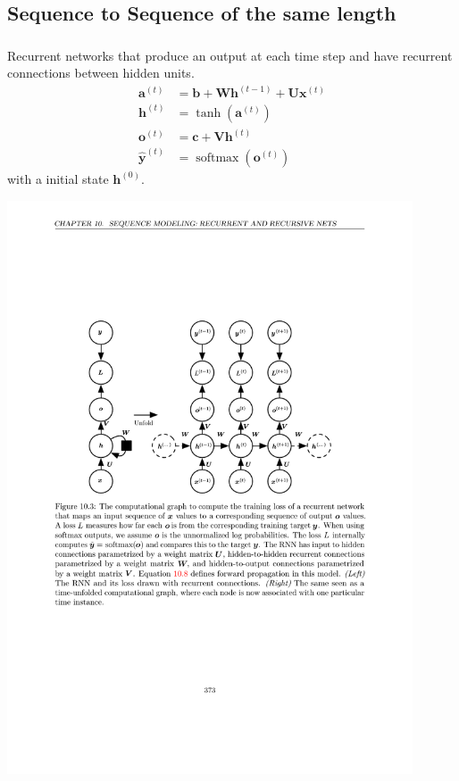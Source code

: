 \documentclass[12pt, a4paper]{article}
\def\vb{\boldsymbol{b}}
\def\vc{\boldsymbol{c}}
\def\vU{\boldsymbol{U}}
\def\vV{\boldsymbol{V}}
\def\vW{\boldsymbol{W}}
\DeclareMathOperator*{\softmax}{softmax}
\newcommand{\egva}[1]{\boldsymbol{a}^{(#1)}}
\newcommand{\egvh}[1]{\boldsymbol{h}^{(#1)}}
\newcommand{\egvo}[1]{\boldsymbol{o}^{(#1)}}
\newcommand{\egvx}[1]{\boldsymbol{x}^{(#1)}}
\newcommand{\eghvy}[1]{\hat{\boldsymbol{y}}^{(#1)}}
\begin{document}
\subsection{Sequence to Sequence of the same length}

\subsubsection{}
Recurrent networks that produce an output at each time step and have recurrent connections between hidden units.
\begin{equation}
    \begin{split}
        \egva{t} &= \vb + \vW\egvh{t-1} + \vU\egvx{t} \\
        \egvh{t} &= \tanh(\egva{t}) \\
        \egvo{t} &= \vc + \vV\egvh{t} \\
        \eghvy{t} &= \softmax(\egvo{t})
    \end{split}
    \label{rnn_for}
\end{equation}
with a initial state $\egvh{0}$.
\begin{center}
    \includegraphics[width=0.9\textwidth]{../imgs/RNN_1.pdf} 
\end{center}
\end{document}
